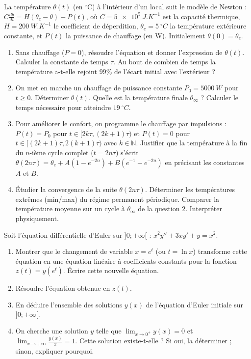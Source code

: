 \documentclass[11pt]{article}
\begin{document}
\begin{exercice}
La température $\theta(t)$ (en $^\circ\mathrm{C}$) à l'intérieur d'un local suit le modèle de Newton : $C \frac{d\theta}{dt} = H(\theta_e - \theta) + P(t)$, où $C = \SI{5e5}{J.K^{-1}}$ est la capacité thermique, $H = \SI{200}{W.K^{-1}}$ le coefficient de déperdition, $\theta_e = \SI{5}{^\circ C}$ la température extérieure constante, et $P(t)$ la puissance de chauffage (en W). Initialement $\theta(0) = \theta_e$.
\begin{enumerate}
    \item Sans chauffage ($P=0$), résoudre l'équation et donner l'expression de $\theta(t)$. Calculer la constante de temps $\tau$. Au bout de combien de temps la température a-t-elle rejoint $99\%$ de l'écart initial avec l'extérieur ?
    \item On met en marche un chauffage de puissance constante $P_0 = \SI{5000}{W}$ pour $t \ge 0$. Déterminer $\theta(t)$. Quelle est la température finale $\theta_{\infty}$ ? Calculer le temps nécessaire pour atteindre $\SI{19}{^\circ C}$.
    \item Pour améliorer le confort, on programme le chauffage par impulsions : $P(t) = P_0$ pour $t \in [2k\tau, (2k+1)\tau)$ et $P(t)=0$ pour $t \in [(2k+1)\tau, 2(k+1)\tau)$ avec $k \in \mathbb{N}$. Justifier que la température à la fin du $n$-ième cycle complet ($t = 2n\tau$) s'écrit $\theta(2n\tau) = \theta_e + A(1 - e^{-2n}) + B(e^{-1} - e^{-2n})$ en précisant les constantes $A$ et $B$.
    \item Étudier la convergence de la suite $\theta(2n\tau)$. Déterminer les températures extrêmes (min/max) du régime permanent périodique. Comparer la température moyenne sur un cycle à $\theta_{\infty}$ de la question 2. Interpréter physiquement.
\end{enumerate}
\end{exercice}

\begin{exercice}
Soit l'équation différentielle d'Euler sur $]0; +\infty[$ : $x^2 y'' + 3x y' + y = x^2$.
\begin{enumerate}
    \item Montrer que le changement de variable $x = e^t$ (ou $t = \ln x$) transforme cette équation en une équation linéaire à coefficients constants pour la fonction $z(t) = y(e^t)$. Écrire cette nouvelle équation.
    \item Résoudre l'équation obtenue en $z(t)$.
    \item En déduire l'ensemble des solutions $y(x)$ de l'équation d'Euler initiale sur $]0; +\infty[$.
    \item On cherche une solution $y$ telle que $\lim_{x \to 0^+} y(x) = 0$ et $\lim_{x \to +\infty} \frac{y(x)}{x} = 1$. Cette solution existe-t-elle ? Si oui, la déterminer ; sinon, expliquer pourquoi.
\end{enumerate}
\end{exercice}
\end{document}

